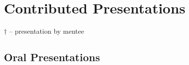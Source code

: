 \documentclass{article}[12pt]
\begin{document}
	
	
	\section*{Contributed Presentations}
	
	\newcommand{\numOralTalks}{22}
	\newcommand{\numPosterTalks}{15}
	
	\vspace{-0.4em}
	$\dagger$ -- presentation by mentee  %
	
	\vspace{-0.5em}
	\subsection*{Oral Presentations}
	
\end{document}
